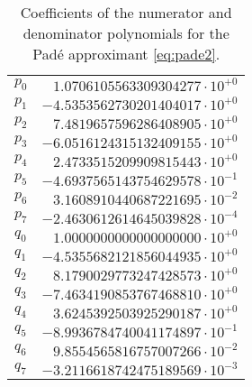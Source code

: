 \documentclass[10pt,DIV16,twocolumn,numbers=noenddot]{scrartcl}
\begin{document}
\begin{table}[t]
  \centering
  \caption{Coefficients of the numerator and denominator polynomials
    for the Padé approximant \eqref{eq:pade2}.}
  \begin{tabular}{lr}
    \toprule
    $p_0$ & $ 1.0706105563309304277\cdot 10^{+0}$ \\
    $p_1$ & $-4.5353562730201404017\cdot 10^{+0}$ \\
    $p_2$ & $ 7.4819657596286408905\cdot 10^{+0}$ \\
    $p_3$ & $-6.0516124315132409155\cdot 10^{+0}$ \\
    $p_4$ & $ 2.4733515209909815443\cdot 10^{+0}$ \\
    $p_5$ & $-4.6937565143754629578\cdot 10^{-1}$ \\
    $p_6$ & $ 3.1608910440687221695\cdot 10^{-2}$ \\
    $p_7$ & $-2.4630612614645039828\cdot 10^{-4}$ \\
    $q_0$ & $ 1.0000000000000000000\cdot 10^{+0}$ \\
    $q_1$ & $-4.5355682121856044935\cdot 10^{+0}$ \\
    $q_2$ & $ 8.1790029773247428573\cdot 10^{+0}$ \\
    $q_3$ & $-7.4634190853767468810\cdot 10^{+0}$ \\
    $q_4$ & $ 3.6245392503925290187\cdot 10^{+0}$ \\
    $q_5$ & $-8.9936784740041174897\cdot 10^{-1}$ \\
    $q_6$ & $ 9.8554565816757007266\cdot 10^{-2}$ \\
    $q_7$ & $-3.2116618742475189569\cdot 10^{-3}$ \\
    \bottomrule
  \end{tabular}
  \label{tab:coeffs}
\end{table}
\end{document}
